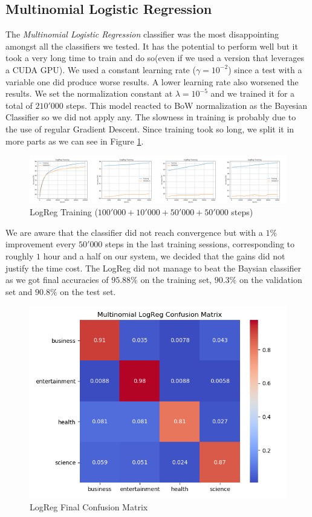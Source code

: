 \documentclass[10pt,a4paper]{report}
\begin{document}
\subsection{Multinomial Logistic Regression}
The \textit{Multinomial Logistic Regression} classifier was the most disappointing amongst all the classifiers we tested. It has the potential to perform well but it took a very long time to train and do so(even if we used a version that leverages a CUDA GPU). We used a constant learning rate ($\gamma=10^{-2}$) since a test with a variable one did produce worse results. A lower learning rate also worsened the results. We set the normalization constant at $\lambda=10^{-5}$ and we trained it for a total of $210'000$ steps. This model reacted to BoW normalization as the Bayesian Classifier so we did not apply any. The slowness in training is probably due to the use of regular Gradient Descent. Since training took so long, we split it in more parts as we can see in Figure \ref{fig:logreg_train}. 
\begin{figure}[!ht]
\centering
\includegraphics[width=\linewidth]{full_logreg_training.png}
\caption{LogReg Training ($100'000+ 10'000 + 50'000 + 50'000$ steps)}
\label{fig:logreg_train}
\end{figure}
We are aware that the classifier did not reach convergence but with a $1 \%$ improvement every $50'000$ steps in the last training sessions, corresponding to roughly $1$ hour and a half on our system, we decided that the gains did not justify the time cost. The LogReg did not manage to beat the Baysian classifier as we got final accuracies of $95.88 \%$ on the training set, $90.3 \%$ on the validation set and $90.8 \%$ on the test set.  
\begin{figure}[!ht]
\centering
\includegraphics[width=0.5\linewidth]{logreg_confmat.png}
\caption{LogReg Final Confusion Matrix}
\label{fig:logreg_confmat}
\end{figure}
\end{document}
